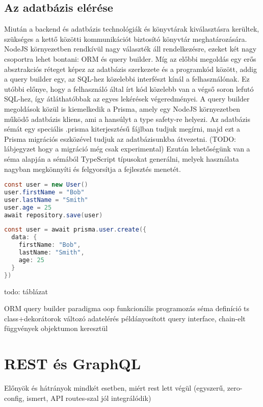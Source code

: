 \subsection{Az adatbázis elérése}
Miután a backend és adatbázis technológiák és könyvtárak kiválasztásra kerültek, szükséges a kettő közötti kommunikációt biztosító könyvtár meghatározására.
NodeJS környezetben rendkívül nagy választék áll rendelkezésre, ezeket két nagy csoportra lehet bontani: ORM és query builder.
Míg az előbbi megoldás egy erős absztrakciós réteget képez az adatbázis szerkezete és a programkód között, addig a query builder egy, az SQL-hez közelebbi interfészt kínál a felhasználónak.
Ez utóbbi előnye, hogy a felhasználó által írt kód közelebb van a végső soron lefutó SQL-hez, így átláthatóbbak az egyes lekérések végeredményei.
A query builder megoldások közül is kiemelkedik a Prisma, amely egy NodeJS környezetben működő adatbázis kliens, ami a hansúlyt a type safety-re helyezi.
Az adatbázis sémát egy speciális .prisma kiterjesztésű fájlban tudjuk megírni, majd ezt a Prisma migrációs eszközével tudjuk az adatbázisunkba átvezetni. (TODO: lábjegyzet hogy a migráció még csak experimental)
Ezután lehetőségünk van a séma alapján a sémából TypeScript típusokat generálni, melyek használata nagyban megkönnyíti és felgyorsítja a fejlesztés menetét.

\begin{lstlisting}[language=Java, caption=Adatbázis beillesztés TypeORM környezetben]
const user = new User()
user.firstName = "Bob"
user.lastName = "Smith"
user.age = 25
await repository.save(user)
\end{lstlisting}

\begin{lstlisting}[language=Java, caption=Adatbázis beillesztés Prisma segítségével]
const user = await prisma.user.create({
  data: {
    firstName: "Bob",
    lastName: "Smith",
    age: 25
  }
})
\end{lstlisting}

todo: táblázat

                  ORM                     query builder
paradigma         oop                  funkcionális programozás
séma definíció  ts class+dekorátorok         változó
adatelérés     példányosított            query interface, chain-elt függvények
              objektumon keresztül




\section{REST és GraphQL}
Előnyök és hátrányok mindkét esetben, miért rest lett végül (egyszerű, zero-config, ismert, API routes-szal jól integrálódik)


